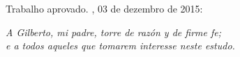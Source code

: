 \begin{folhadeaprovacao}

  \begin{center}
    {\ABNTEXchapterfont\large\imprimirautor}

    \vspace*{\fill}\vspace*{\fill}
    \begin{center}
      \ABNTEXchapterfont\bfseries\Large\imprimirtitulo
    \end{center}
    \vspace*{\fill}
    
    \hspace{.45\textwidth}
    \begin{minipage}{.5\textwidth}
        \imprimirpreambulo
    \end{minipage}%
    \vspace*{\fill}
   \end{center}
        
   Trabalho aprovado. \imprimirlocal, 03 de dezembro de 2015:

      
  
\end{folhadeaprovacao}


\begin{dedicatoria}
   \vspace*{\fill}
   \centering
   \noindent
   \textit{ A Gilberto, mi padre, torre de razón y de firme fe; \\ e a todos aqueles que tomarem interesse neste estudo.} \vspace*{\fill}
\end{dedicatoria}

